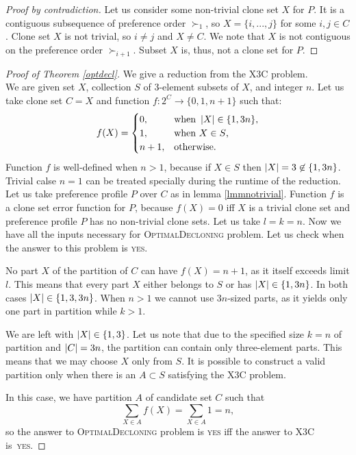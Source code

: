 \begin{proof}[Proof by contradiction]
Let us consider some non-trivial clone set $X$ for $P$.
It is a contiguous subsequence of preference order $\succ_1$, so $X = \{i,...,j\}$ for some $i,j \in C$.
Clone set $X$ is not trivial, so $i\neq{j}$ and $X\neq{C}$.
We note that $X$ is not contiguous on the preference order $\succ_{i+1}$.
Subset $X$ is, thus, not a clone set for $P$.
\end{proof}

\begin{proof}[Proof of Theorem \ref{optdecl}]
We give a reduction from the \textsc{X3C} problem. \\
We are given set $X$, collection $S$ of 3-element subsets of $X$, and integer $n$.
Let us take clone set $C = X$ and function $f:2^C\rightarrow \{0,1,n+1\}$ such that:
$$ f(X) =
\begin{cases}
0, &\text{when } \left\vert X \right\vert \in \{1,3n\} \text{,} \\
1, &\text{when }  X \in S \text{,} \\
n+1, &\text{otherwise.}
\end{cases}
$$
Function $f$ is well-defined when $n>1$, because if $X \in S$ then $\left\vert X \right\vert = 3 \not\in \{1,3n\}$.
Trivial calse $n=1$ can be treated specially during the runtime of the reduction.
Let us take preference profile $P$ over $C$ as in lemma \ref{lmmnotrivial}.
Function $f$ is a clone set error function for $P$, because $f(X) = 0$ iff $X$ is a trivial clone set
and preference profile $P$ has no non-trivial clone sets.
Let us take $l=k=n$.
Now we have all the inputs necessary for \textsc{OptimalDecloning} problem.
Let us check when the answer to this problem is \textsc{yes}.

No part $X$ of the partition of $C$ can have $f(X)=n+1$, as it itself exceeds limit $l$.
This means that every part $X$ either belongs to $S$ or has $\left\vert X \right\vert \in \{1,3n\}$.
In both cases $\left\vert X \right\vert \in \{1,3,3n\}$.
When $n>1$ we cannot use $3n$-sized parts,
as it yields only one part in partition while $k>1$.

We are left with $\left\vert X \right\vert \in \{1,3\}$.
Let us note that due to the specified size $k=n$ of partition and $\left\vert C \right\vert = 3n$,
the partition can contain only three-element parts.
This means that we may choose $X$ only from $S$.
It is possible to construct a valid partition only when there is an $A \subset S$ satisfying the \textsc{X3C} problem.

In this case, we have partition $A$ of candidate set $C$ such that
$$ \sum_{X \in A} f(X) = \sum_{X \in A} 1 = n,$$
so the answer to \textsc{OptimalDecloning} problem is \textsc{yes}
iff the answer to \textsc{X3C} is~\textsc{yes}.
\end{proof}



